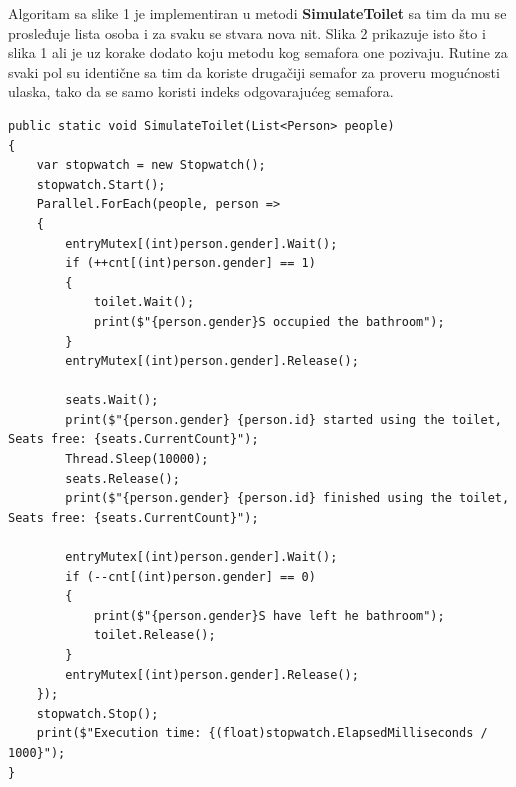 \documentclass[11pt]{article}
\begin{document}
	\newpage
	Algoritam sa slike 1 je implementiran u metodi \textbf{SimulateToilet}
	sa tim da mu se prosleđuje lista osoba i za svaku se stvara nova nit.
	Slika 2 prikazuje isto što i slika 1 ali je uz korake dodato koju metodu
	kog semafora one pozivaju.
	Rutine za svaki pol su identične sa tim da koriste drugačiji semafor za
	proveru mogućnosti ulaska, tako da se samo koristi indeks odgovarajućeg
	semafora.
	\begin{lstlisting}[language={[Sharp]C}]
public static void SimulateToilet(List<Person> people)
{
    var stopwatch = new Stopwatch();
    stopwatch.Start();
    Parallel.ForEach(people, person =>
    {
        entryMutex[(int)person.gender].Wait();
        if (++cnt[(int)person.gender] == 1)
        {
            toilet.Wait();
            print($"{person.gender}S occupied the bathroom");
        }
        entryMutex[(int)person.gender].Release();

        seats.Wait();
        print($"{person.gender} {person.id} started using the toilet, Seats free: {seats.CurrentCount}");
        Thread.Sleep(10000);
        seats.Release();
        print($"{person.gender} {person.id} finished using the toilet, Seats free: {seats.CurrentCount}");

        entryMutex[(int)person.gender].Wait();
        if (--cnt[(int)person.gender] == 0)
        {
            print($"{person.gender}S have left he bathroom");
            toilet.Release();
        }
        entryMutex[(int)person.gender].Release();
    });
    stopwatch.Stop();
    print($"Execution time: {(float)stopwatch.ElapsedMilliseconds / 1000}");
}
	\end{lstlisting}
\end{document}
